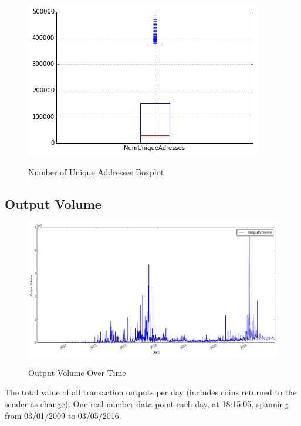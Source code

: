 \begin{figure}[bth]
  \myfloatalign
  {\includegraphics[width=1\linewidth]
    {gfx/n-unique-addresses-boxplot}}
  \caption{Number of Unique Addresses
    Boxplot}
  \label{fig:n-unique-addresses-boxplot}
\end{figure}

\clearpage

\subsection{Output Volume}
\label{sec:output-volume}

\begin{figure}[bth]
  \myfloatalign
  {\includegraphics[width=1\linewidth]
    {gfx/output-volume-over-time}}
  \caption{Output Volume
    Over Time}
  \label{fig:output-volume-over-time}
\end{figure}

The total value of all transaction outputs per day (includes coins
returned to the sender as change). One real number data point each
day, at 18:15:05, spanning from 03/01/2009 to 03/05/2016.

